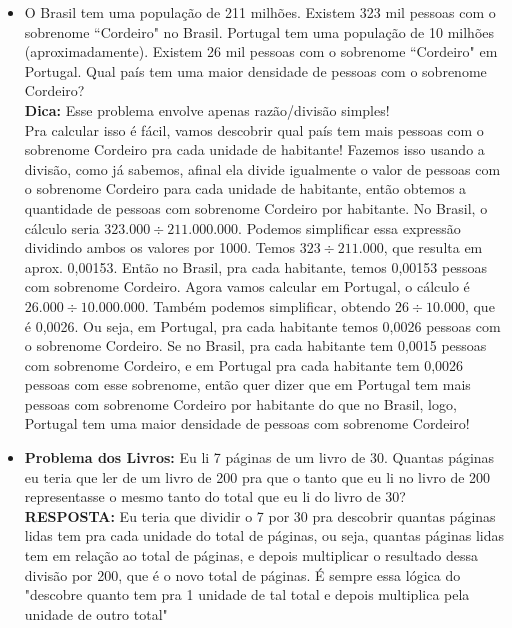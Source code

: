 \documentclass{article}
\begin{document}
\begin{itemize}
    \item O Brasil tem uma população de 211 milhões. Existem 323 mil pessoas com o sobrenome ``Cordeiro" no Brasil. Portugal tem uma população de 10 milhões (aproximadamente). Existem 26 mil pessoas com o sobrenome ``Cordeiro" em Portugal. Qual país tem uma maior densidade de pessoas com o sobrenome Cordeiro?
    \\[5pt]
    \textbf{Dica:} Esse problema envolve apenas razão/divisão simples!
    \\[5pt]
    Pra calcular isso é fácil, vamos descobrir qual país tem mais pessoas com o sobrenome Cordeiro pra cada unidade de habitante! Fazemos isso usando a divisão, como já sabemos, afinal ela divide igualmente o valor de pessoas com o sobrenome Cordeiro para cada unidade de habitante, então obtemos a quantidade de pessoas com sobrenome Cordeiro por habitante. No Brasil, o cálculo seria $323.000\div211.000.000$. Podemos simplificar essa expressão dividindo ambos os valores por 1000. Temos $323\div211.000$, que resulta em aprox. 0,00153. Então no Brasil, pra cada habitante, temos 0,00153 pessoas com sobrenome Cordeiro. Agora vamos calcular em Portugal, o cálculo é $26.000\div10.000.000$. Também podemos simplificar, obtendo $26\div10.000$, que é 0,0026. Ou seja, em Portugal, pra cada habitante temos 0,0026 pessoas com o sobrenome Cordeiro. Se no Brasil, pra cada habitante tem 0,0015 pessoas com sobrenome Cordeiro, e em Portugal pra cada habitante tem 0,0026 pessoas com esse sobrenome, então quer dizer que em Portugal tem mais pessoas com sobrenome Cordeiro por habitante do que no Brasil, logo, Portugal tem uma maior densidade de pessoas com sobrenome Cordeiro! 
    
    \item \textbf{Problema dos Livros:} Eu li 7 páginas de um livro de 30. Quantas páginas eu teria que ler de um livro de 200 pra que o tanto que eu li no livro de 200 representasse o mesmo tanto do total que eu li do livro de 30?
    \\[5pt]
    \textbf{RESPOSTA:} Eu teria que dividir o 7 por 30 pra descobrir quantas páginas lidas tem pra cada unidade do total de páginas, ou seja, quantas páginas lidas tem em relação ao total de páginas, e depois multiplicar o resultado dessa divisão por 200, que é o novo total de páginas. É sempre essa lógica do "descobre quanto tem pra 1 unidade de tal total e depois multiplica pela unidade de outro total"


\end{itemize}
\end{document}
